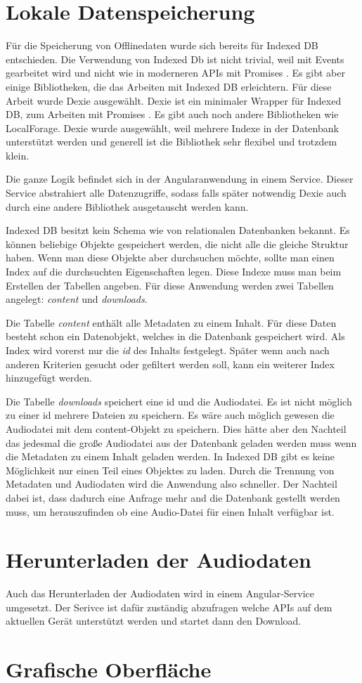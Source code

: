 \section{Lokale Datenspeicherung}
\label{Kap5:Speicherung}
Für die Speicherung von Offlinedaten wurde sich bereits für Indexed DB entschieden. Die Verwendung von Indexed Db ist nicht trivial, weil mit Events gearbeitet wird und nicht wie in moderneren APIs mit Promises \autocite{mdn-indexeddb}. Es gibt aber einige Bibliotheken, die das Arbeiten mit Indexed DB erleichtern. Für diese Arbeit wurde Dexie ausgewählt. Dexie ist ein minimaler Wrapper für Indexed DB, zum Arbeiten mit Promises \autocite{dexie}. Es gibt auch noch andere Bibliotheken wie LocalForage. Dexie wurde ausgewählt, weil mehrere Indexe in der Datenbank unterstützt werden und generell ist die Bibliothek sehr flexibel und trotzdem klein.

Die ganze Logik befindet sich in der Angularanwendung in einem Service. Dieser Service abstrahiert alle Datenzugriffe, sodass falls später notwendig Dexie auch durch eine andere Bibliothek ausgetauscht werden kann. 

Indexed DB besitzt kein Schema wie von relationalen Datenbanken bekannt. Es können beliebige Objekte gespeichert werden, die nicht alle die gleiche Struktur haben. Wenn man diese Objekte aber durchsuchen möchte, sollte man einen Index auf die durchsuchten Eigenschaften legen. Diese Indexe muss man beim Erstellen der Tabellen angeben. Für diese Anwendung werden zwei Tabellen angelegt: \emph{content} und \emph{downloads}. 

Die Tabelle \emph{content} enthält alle Metadaten zu einem Inhalt. Für diese Daten besteht schon ein Datenobjekt, welches in die Datenbank gespeichert wird. Als Index wird vorerst nur die \emph{id} des Inhalts festgelegt. Später wenn auch nach anderen Kriterien gesucht oder gefiltert werden soll, kann ein weiterer Index hinzugefügt werden. 

Die Tabelle \emph{downloads} speichert eine id und die Audiodatei. Es ist nicht möglich zu einer id mehrere Dateien zu speichern. Es wäre auch möglich gewesen die Audiodatei mit dem content-Objekt zu speichern. Dies hätte aber den Nachteil das jedesmal die große Audiodatei aus der Datenbank geladen werden muss wenn die Metadaten zu einem Inhalt geladen werden. In Indexed DB gibt es keine Möglichkeit nur einen Teil eines Objektes zu laden. Durch die Trennung von Metadaten und Audiodaten wird die Anwendung also schneller. Der Nachteil dabei ist, dass dadurch eine Anfrage mehr and die Datenbank gestellt werden muss, um herauszufinden ob eine Audio-Datei für einen Inhalt verfügbar ist.

\section{Herunterladen der Audiodaten}
Auch das Herunterladen der Audiodaten wird in einem Angular-Service umgesetzt. Der Serivce ist dafür zuständig abzufragen welche APIs auf dem aktuellen Gerät unterstützt werden und startet dann den Download. 

\section{Grafische Oberfläche}
